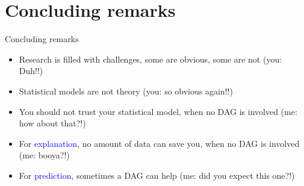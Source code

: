 \section{Concluding remarks}
%
\begin{frame}[negative]
	\sectionpage
\end{frame}
%
%
\begin{lhframe}[rhgraphic={\texttt{[image: think.jpg]}}]
	{Concluding remarks}
	
	\begin{itemize}
		\item Research is filled with challenges, some are obvious, some are not (you: Duh!!)
		\item Statistical models are not theory (you: so obvious again!!)
		\item You should \alert{not} trust your statistical model, when no DAG is involved (me: how about that?!)
		\item For \textcolor{blue}{explanation}, \alert{no amount of data} can save you, when no DAG is involved (me: booya?!)
		\item For \textcolor{blue}{prediction}, sometimes a DAG can help (me: did you expect this one?!)
	\end{itemize} 
\end{lhframe}
%
%